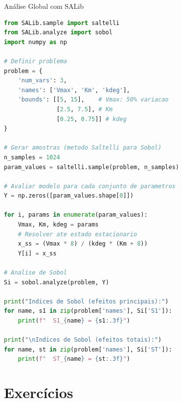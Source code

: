 \begin{frame}{Análise Global com SALib}
\begin{lstlisting}[language=Python, basicstyle=\ttfamily\footnotesize]
from SALib.sample import saltelli
from SALib.analyze import sobol
import numpy as np

# Definir problema
problem = {
    'num_vars': 3,
    'names': ['Vmax', 'Km', 'kdeg'],
    'bounds': [[5, 15],    # Vmax: 50% variacao
               [2.5, 7.5], # Km
               [0.25, 0.75]] # kdeg
}

# Gerar amostras (metodo Saltelli para Sobol)
n_samples = 1024
param_values = saltelli.sample(problem, n_samples)

# Avaliar modelo para cada conjunto de parametros
Y = np.zeros([param_values.shape[0]])

for i, params in enumerate(param_values):
    Vmax, Km, kdeg = params
    # Resolver ate estado estacionario
    x_ss = (Vmax * 8) / (kdeg * (Km + 8))
    Y[i] = x_ss

# Analise de Sobol
Si = sobol.analyze(problem, Y)

print("Indices de Sobol (efeitos principais):")
for name, s1 in zip(problem['names'], Si['S1']):
    print(f"  S1_{name} = {s1:.3f}")

print("\nIndices de Sobol (efeitos totais):")
for name, st in zip(problem['names'], Si['ST']):
    print(f"  ST_{name} = {st:.3f}")
\end{lstlisting}
\end{frame}



\section{Exercícios}

